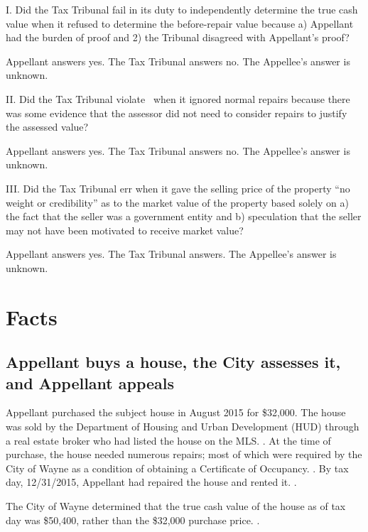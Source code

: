 \documentclass[12pt,\documentclassflag]{michiganCourtOfAppealsBrief}
\begin{document}
\noindent I. Did the Tax Tribunal fail in its duty to independently determine the true cash value when it refused to determine the before-repair value because a) Appellant had the burden of proof and 2) the Tribunal disagreed with Appellant's proof?

Appellant answers yes. The Tax Tribunal answers no. The Appellee's answer is unknown. 
\vspace{\baselineskip}

\noindent II. Did the Tax Tribunal violate \mathieuGast\ when it ignored normal repairs because there was some evidence that the assessor did not need to consider repairs to justify the assessed value?

Appellant answers yes. The Tax Tribunal answers no. The Appellee's answer is unknown.

\vspace{\baselineskip}

\noindent III. Did the Tax Tribunal err when it gave the selling price of the property ``no weight or credibility'' as to the market value of the property based solely on a) the fact that the seller was a government entity and b) speculation that the seller may not have been motivated to receive market value?

Appellant answers yes. The Tax Tribunal answers. The Appellee's answer is unknown. 
 
\newpage

\section{Facts}
\label{facts}
\subsection{Appellant buys a house, the City assesses it, and Appellant appeals}

Appellant purchased the subject house in August 2015 for \$32,000. The house was sold by the Department of Housing and Urban Development (HUD) through a real estate broker who had listed the house on the MLS. \mlsListing[]. At the time of purchase, the house needed numerous repairs; most of which were required by the City of Wayne as a condition of obtaining a Certificate of Occupancy. \repairs[]. By tax day, 12/31/2015, Appellant had repaired the house and rented it. \foj[4-5].

The City of Wayne determined that the true cash value of the house as of tax day was \$50,400, rather than the \$32,000 purchase price. \boardOfReviewDecision.
\end{document}
